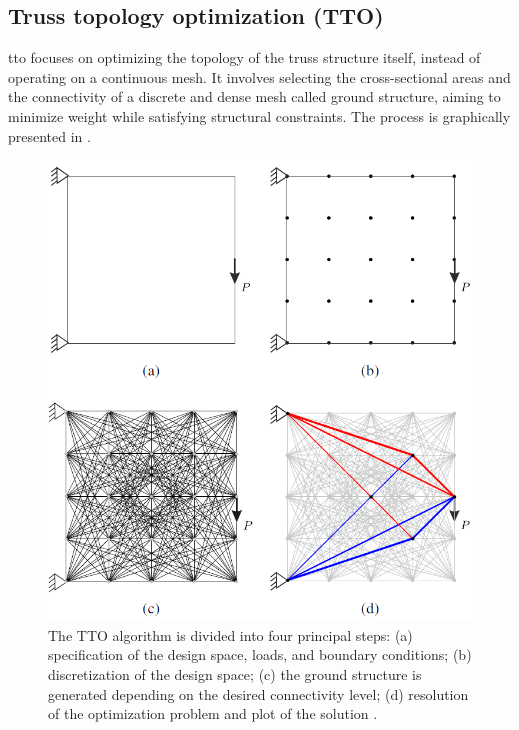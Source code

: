 \subsection{Truss topology optimization (TTO)} \label{sec:02_tto}
\acrfull{tto} focuses on optimizing the topology of the truss structure itself, instead of operating on a continuous mesh. It involves selecting the cross-sectional areas and the connectivity of a discrete and dense mesh called ground structure, aiming to minimize weight while satisfying structural constraints. The process is graphically presented in .

\begin{figure}
    \centering
    \includegraphics[width=0.7\linewidth]{figures/02_literature/layopt.png}
    \caption{The TTO algorithm is divided into four principal steps: (a)
    specification of the design space, loads, and boundary conditions; (b) discretization
    of the design space; (c) the ground structure is generated depending on the
    desired connectivity level; (d) resolution of the optimization problem and plot of
    the solution \cite{he_python_2019}.}
    \label{fig:02_tto_ex}
\end{figure}

